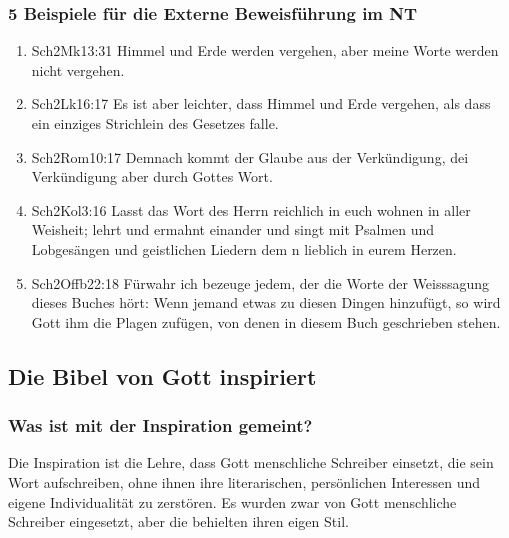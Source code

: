 \subsubsection{5 Beispiele für die Externe Beweisführung im NT}
\renewcommand{\labelenumi}{\Roman{enumi}}
\begin{enumerate}
	\item  
	\begin{bibeltext}{Sch2}{Mk}{13:31}
	Himmel und Erde werden vergehen, aber meine Worte werden nicht vergehen.
	\end{bibeltext}
	\item 
	\begin{bibeltext}{Sch2}{Lk}{16:17}
		Es ist aber leichter, dass Himmel und Erde vergehen, als dass ein einziges Strichlein des Gesetzes falle.
	\end{bibeltext}
	\item 
	\begin{bibeltext}{Sch2}{Rom}{10:17}
		Demnach kommt der Glaube aus der Verkündigung, dei Verkündigung aber durch Gottes Wort.
	\end{bibeltext}
	\item 
	\begin{bibeltext}{Sch2}{Kol}{3:16}
		Lasst das Wort des Herrn reichlich in euch wohnen in aller Weisheit; lehrt und ermahnt einander und singt mit Psalmen und Lobgesängen und geistlichen Liedern dem \herr n lieblich in eurem Herzen.
	\end{bibeltext}
	\item 
	\begin{bibeltext}{Sch2}{Offb}{22:18}
		Fürwahr ich bezeuge jedem, der die Worte der Weisssagung dieses Buches hört: Wenn jemand etwas zu diesen Dingen hinzufügt, so wird Gott ihm die Plagen zufügen, von denen in diesem Buch geschrieben stehen.
	\end{bibeltext}
\end{enumerate}
\subsection{Die Bibel von Gott inspiriert}
\subsubsection{Was ist mit der Inspiration gemeint?}
Die Inspiration ist die Lehre, dass Gott menschliche Schreiber einsetzt, die sein Wort aufschreiben, ohne ihnen ihre literarischen, persönlichen Interessen und eigene Individualität zu zerstören. Es wurden zwar von Gott menschliche Schreiber eingesetzt, aber die behielten ihren eigen Stil.
